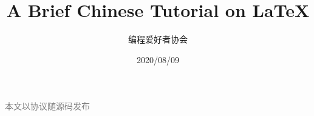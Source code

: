 
\begin{titlepage}
	\title{\bf \docTitle \\ A Brief Chinese Tutorial on \LaTeX}
	\author{编程爱好者协会}
	\date{2020/08/09}
	\maketitle
	\begin{center}
		\textcolor{gray}{本文以\licenseName 协议随源码发布}\\[2cm]
		\bigorglogo
	\end{center}
	\thispagestyle{empty}
	\newpage
\end{titlepage}
